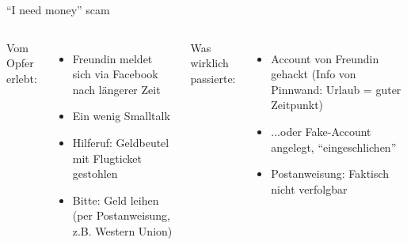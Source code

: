 \begin{frame}{"`I need money"' scam}
	\begin{columns}[t]
		Vom Opfer erlebt:
		\begin{itemize}
			\item Freundin meldet sich via Facebook nach längerer Zeit
			\item Ein wenig Smalltalk
			\item<2-> Hilferuf: Geldbeutel mit Flugticket gestohlen
			\item<2-> Bitte: Geld leihen (per Postanweisung, z.B. Western Union)
		\end{itemize}
		Was wirklich passierte:
		\begin{itemize}
			\item<3-> Account von Freundin gehackt (Info von Pinnwand: Urlaub = guter Zeitpunkt)
			\item<3-> ...oder Fake-Account angelegt, "`eingeschlichen"'
			\item<3-> Postanweisung: Faktisch nicht verfolgbar
		\end{itemize}
	\end{columns}
\end{frame}

